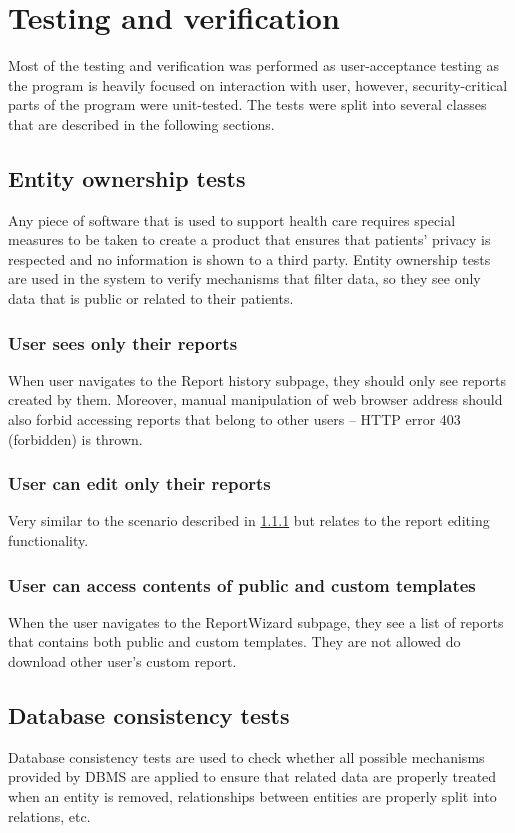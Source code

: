 \documentclass[12pt, twoside, openany]{report}
\theoremstyle{definition}
\begin{document}
\chapter{Testing and verification}
Most of the testing and verification was performed as user-acceptance testing as the program is heavily focused on interaction with user, however, security-critical parts of the program were unit-tested.
The tests were split into several classes that are described in the following sections. 

\section{Entity ownership tests}
Any piece of software that is  used to support health care requires special measures to be taken to create a product that ensures that patients' privacy is respected and no information is shown to a third party. Entity ownership tests are used in the system to verify mechanisms that filter data, so they see only data that is public or related to their patients. 

\subsection{User sees only their reports}\label{report-owner}
When user navigates to the Report history subpage, they should only see reports created by them. Moreover, manual manipulation of web browser address should also forbid accessing reports that belong to other users -- HTTP error 403 (forbidden) is thrown.
\subsection{User can edit only their reports}
Very similar to the scenario described in \ref{report-owner} but relates to the report editing functionality.

\subsection{User can access contents of public and custom templates}
When the user navigates to the ReportWizard subpage, they see a list of reports that contains both public and custom templates. They are not allowed do download other user's custom report.


\section{Database consistency tests}
Database consistency tests are used to check whether all possible mechanisms provided by DBMS are applied to ensure that related data are properly treated when an entity is removed, relationships between entities are properly split into relations, etc.
\end{document}
